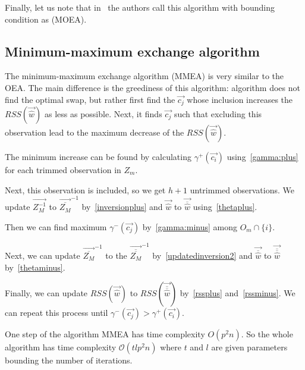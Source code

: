 Finally, let us note that in~\cite{agullo2001new} the authors call this algorithm with bounding condition as  (MOEA).




\subsection{Minimum-maximum exchange algorithm} \label{mmeasection}
The minimum-maximum exchange algorithm (MMEA) is very similar to the OEA. The main difference is the greediness of this algorithm: algorithm does not find the optimal swap, but rather first find the $\vec{c_j}$  whose inclusion increases the $RSS(\vec{\hat{w}})$ as less as possible.
Next, it finds $\vec{c_j}$ such that excluding this observation lead to the maximum decrease of the $RSS(\vec{\hat{w}})$.

The minimum increase can be found by calculating $\gamma^{+}(\vec{c_i}) $ using~\eqref{gamma:plus} for each trimmed observation in  $Z_m$.

Next, this observation is included, so we get $h+1$ untrimmed observations. We update 
$\vec{Z_M^{-1}}$ to  $\vec{\overline{Z_M}}^{-1}$ by~\eqref{inversionplus} and $\vec{\hat{w}}$ to $\vec{\overline{\hat{w}}}$ using~\eqref{thetaplus}.

Then we can find maximum  $\gamma^{-}(\vec{c_j})$ by~\eqref{gamma:minus} among $O_m \cap \{ i \}$.

Next, we can update $\vec{\overline{Z_M}}^{-1}$ to the   $\vec{\overline{\overline{Z_M}}}^{-1}$ by~\eqref{updatedinversion2} and 
$\vec{\overline{\hat{w}}}$ to $\vec{\overline{\overline{\hat{w}}}}$ by~\eqref{thetaminus}.

Finally, we can update $RSS(\vec{\hat{w}})$ to $RSS(\vec{\overline{\overline{\hat{w}}}})$ by~\eqref{rssplus} and~\eqref{rssminus}. We can repeat this process until $\gamma^{-}(\vec{c_j}) > \gamma^{+}(\vec{c_i})$.

\begin{observation} \label{timecomplexitymmea}
    One step of the algorithm MMEA has time complexity $O(p^2n)$. So the whole algorithm has time complexity $\mathcal{O}(tlp^2n)$ where $t$ and $l$ are given parameters bounding the number of iterations.
\end{observation}

